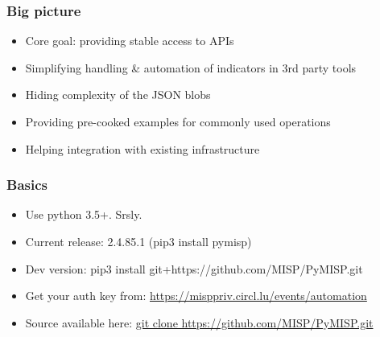 


\begin{frame}[t,plain]
\titlepage
\end{frame}

\begin{frame}
    \frametitle{Big picture}
    \begin{itemize}
        \item Core goal: providing stable access to APIs
        \item Simplifying handling \& automation of indicators in 3rd party tools
        \item Hiding complexity of the JSON blobs
        \item Providing pre-cooked examples for commonly used operations
        \item Helping integration with existing infrastructure
    \end{itemize}
\end{frame}

\begin{frame}
    \frametitle{Basics}
    \begin{itemize}
        \item Use python 3.5+. Srsly.
        \item Current release: 2.4.85.1 (pip3 install pymisp)
        \item Dev version: pip3 install git+https://github.com/MISP/PyMISP.git
        \item Get your auth key from: \url{https://misppriv.circl.lu/events/automation}
        \item Source available here: \url{git clone https://github.com/MISP/PyMISP.git}
    \end{itemize}
\end{frame}

